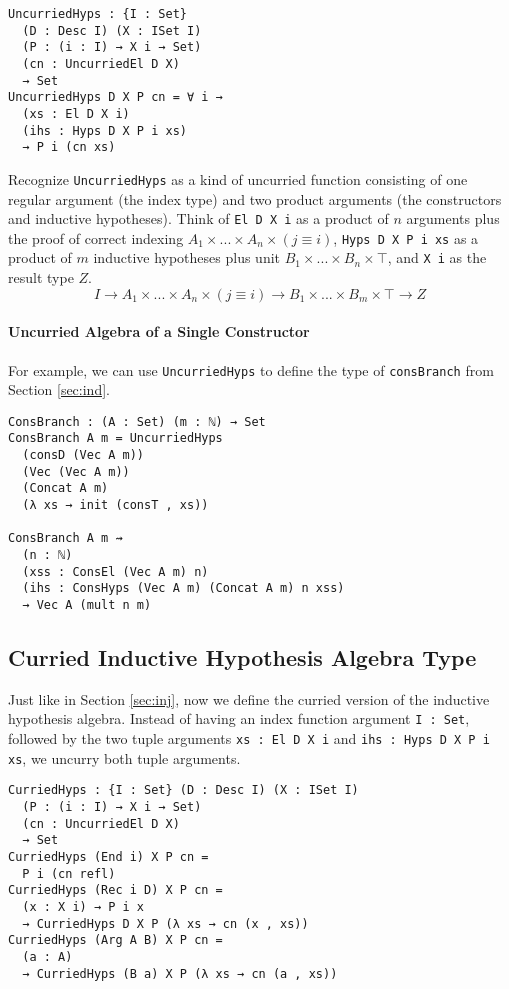 \documentclass[preprint,nonatbib]{sigplanconf}
\newcommand{\refsec}[1]{Section \ref{sec:#1}}
\begin{document}
\begin{verbatim}
UncurriedHyps : {I : Set}
  (D : Desc I) (X : ISet I)
  (P : (i : I) → X i → Set)
  (cn : UncurriedEl D X)
  → Set
UncurriedHyps D X P cn = ∀ i →
  (xs : El D X i)
  (ihs : Hyps D X P i xs)
  → P i (cn xs)
\end{verbatim}

Recognize {\tt UncurriedHyps} as a kind of uncurried function
consisting of one regular argument (the index type) and two product
arguments (the constructors and inductive hypotheses). 
Think of
{\tt El D X i} as a product of $n$ arguments plus the proof of correct
indexing $A_1 × ... × A_n × (j≡i)$, {\tt Hyps D X P i xs} as a
product of $m$ inductive hypotheses plus unit $B_1 × ... × B_n × ⊤$,
and {\tt X i} as the result type $Z$.
\[
I → A_1 × ... × A_n × (j ≡ i) → B_1 × ... × B_m × ⊤ → Z
\]

\paragraph{Uncurried Algebra of a Single Constructor}

For example, we can use {\tt UncurriedHyps} to define the type of
{\tt consBranch} from \refsec{ind}.

\begin{verbatim}
ConsBranch : (A : Set) (m : ℕ) → Set
ConsBranch A m = UncurriedHyps
  (consD (Vec A m))
  (Vec (Vec A m))
  (Concat A m)
  (λ xs → init (consT , xs))

ConsBranch A m ⇝
  (n : ℕ)
  (xss : ConsEl (Vec A m) n)
  (ihs : ConsHyps (Vec A m) (Concat A m) n xss)
  → Vec A (mult n m)
\end{verbatim}

\subsection{Curried Inductive Hypothesis Algebra Type}

Just like in \refsec{inj}, now we define the curried version of
the inductive hypothesis algebra. Instead of having an index function
argument {\tt I : Set}, followed by the two tuple arguments
{\tt xs : El D X i} and {\tt ihs : Hyps D X P i xs}, we uncurry
both tuple arguments.

\begin{verbatim}
CurriedHyps : {I : Set} (D : Desc I) (X : ISet I)
  (P : (i : I) → X i → Set)
  (cn : UncurriedEl D X)
  → Set
CurriedHyps (End i) X P cn =
  P i (cn refl)
CurriedHyps (Rec i D) X P cn =
  (x : X i) → P i x
  → CurriedHyps D X P (λ xs → cn (x , xs))
CurriedHyps (Arg A B) X P cn =
  (a : A)
  → CurriedHyps (B a) X P (λ xs → cn (a , xs))
\end{verbatim}
\end{document}
